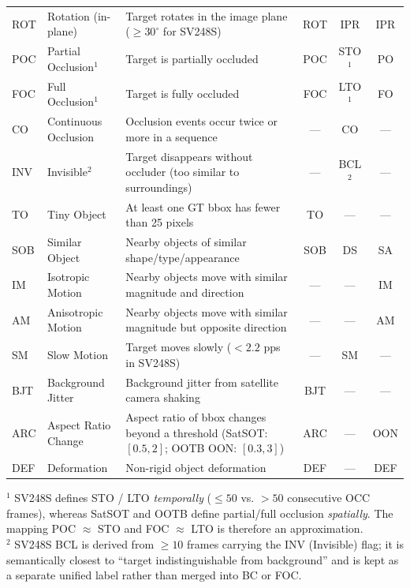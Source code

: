 \begin{table}[t]
{\begin{tabular}{llp{7.4cm}ccc}
ROT  & Rotation (in-plane)        & Target rotates in the image plane ($\geq 30^{\circ}$ for SV248S) & ROT & IPR & IPR \\
POC  & Partial Occlusion$^{1}$    & Target is partially occluded & POC & STO$^{1}$ & PO  \\
FOC  & Full Occlusion$^{1}$       & Target is fully occluded    & FOC & LTO$^{1}$ & FO  \\
CO   & Continuous Occlusion       & Occlusion events occur twice or more in a sequence & --- & CO  & --- \\
INV  & Invisible$^{2}$            & Target disappears without occluder (too similar to surroundings) & --- & BCL$^{2}$ & --- \\
TO   & Tiny Object                & At least one GT bbox has fewer than 25 pixels & TO  & --- & --- \\
SOB  & Similar Object             & Nearby objects of similar shape/type/appearance & SOB & DS  & SA  \\
IM   & Isotropic Motion           & Nearby objects move with similar magnitude and direction & --- & --- & IM  \\
AM   & Anisotropic Motion         & Nearby objects move with similar magnitude but opposite direction & --- & --- & AM  \\
SM   & Slow Motion                & Target moves slowly ($<2.2$ pps in SV248S) & --- & SM  & --- \\
BJT  & Background Jitter          & Background jitter from satellite camera shaking & BJT & --- & --- \\
ARC  & Aspect Ratio Change        & Aspect ratio of bbox changes beyond a threshold (SatSOT: $[0.5, 2]$; OOTB OON: $[0.3, 3]$) & ARC & --- & OON \\
DEF  & Deformation                & Non-rigid object deformation & DEF & --- & DEF \\
\bottomrule
\end{tabular}
}
\vspace{2pt}
\begin{flushleft}\footnotesize
$^{1}$ SV248S defines STO / LTO \emph{temporally} ($\leq 50$ vs. $>50$ consecutive OCC frames),
whereas SatSOT and OOTB define partial/full occlusion \emph{spatially}. The mapping
POC $\approx$ STO and FOC $\approx$ LTO is therefore an approximation.\\
$^{2}$ SV248S BCL is derived from $\geq 10$ frames carrying the INV (Invisible) flag;
it is semantically closest to ``target indistinguishable from background'' and is kept
as a separate unified label rather than merged into BC or FOC.
\end{flushleft}
\end{table}

